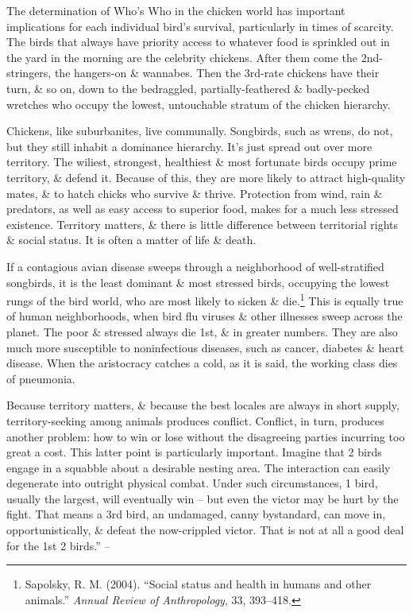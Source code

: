 \documentclass[oneside]{book}
\numberwithin{equation}{section}
\begin{document}
The determination of Who's Who in the chicken world has important implications for each individual bird's survival, particularly in times of scarcity. The birds that always have priority access to whatever food is sprinkled out in the yard in the morning are the celebrity chickens. After them come the 2nd-stringers, the hangers-on \& wannabes. Then the 3rd-rate chickens have their turn, \& so on, down to the bedraggled, partially-feathered \& badly-pecked wretches who occupy the lowest, untouchable stratum of the chicken hierarchy.

Chickens, like suburbanites, live communally. Songbirds, such as wrens, do not, but they still inhabit a dominance hierarchy. It's just spread out over more territory. The wiliest, strongest, healthiest \& most fortunate birds occupy prime territory, \& defend it. Because of this, they are more likely to attract high-quality mates, \& to hatch chicks who survive \& thrive. Protection from wind, rain \& predators, as well as easy access to superior food, makes for a much less stressed existence. Territory matters, \& there is little difference between territorial rights \& social status. It is often a matter of life \& death.

If a contagious avian disease sweeps through a neighborhood of well-stratified songbirds, it is the least dominant \& most stressed birds, occupying the lowest rungs of the bird world, who are most likely to sicken \& die.\footnote{Sapolsky, R. M. (2004). ``Social status and health in humans and other animals.'' \textit{Annual Review of Anthropology}, 33, 393--418.} This is equally true of human neighborhoods, when bird flu viruses \& other illnesses sweep across the planet. The poor \& stressed always die 1st, \& in greater numbers. They are also much more susceptible to noninfectious diseases, such as cancer, diabetes \& heart disease. When the aristocracy catches a cold, as it is said, the working class dies of pneumonia.

Because territory matters, \& because the best locales are always in short supply, territory-seeking among animals produces conflict. Conflict, in turn, produces another problem: how to win or lose without the disagreeing parties incurring too great a cost. This latter point is particularly important. Imagine that 2 birds engage in a squabble about a desirable nesting area. The interaction can easily degenerate into outright physical combat. Under such circumstances, 1 bird, usually the largest, will eventually win -- but even the victor may be hurt by the fight. That means a 3rd bird, an undamaged, canny bystandard, can move in, opportunistically, \& defeat the now-crippled victor. That is not at all a good deal for the 1st 2 birds.'' -- \cite[pp. 32--34]{Peterson2018}
\end{document}
